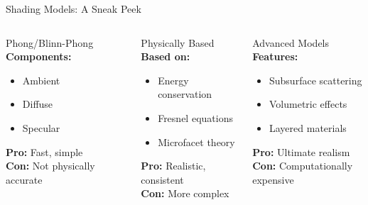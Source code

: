 \begin{frame}{Shading Models: A Sneak Peek}
    \begin{columns}
        \begin{column}{0.33\textwidth}
            \begin{conceptbox}{Phong/Blinn-Phong}
                \textbf{Components:}
                \begin{itemize}
                    \item Ambient
                    \item Diffuse
                    \item Specular
                \end{itemize}
                \textbf{Pro:} Fast, simple\\
                \textbf{Con:} Not physically accurate
            \end{conceptbox}
        \end{column}
        \begin{column}{0.33\textwidth}
            \begin{conceptbox}{Physically Based}
                \textbf{Based on:}
                \begin{itemize}
                    \item Energy conservation
                    \item Fresnel equations
                    \item Microfacet theory
                \end{itemize}
                \textbf{Pro:} Realistic, consistent\\
                \textbf{Con:} More complex
            \end{conceptbox}
        \end{column}
        \begin{column}{0.33\textwidth}
            \begin{conceptbox}{Advanced Models}
                \textbf{Features:}
                \begin{itemize}
                    \item Subsurface scattering
                    \item Volumetric effects
                    \item Layered materials
                \end{itemize}
                \textbf{Pro:} Ultimate realism\\
                \textbf{Con:} Computationally expensive
            \end{conceptbox}
        \end{column}
    \end{columns}
\end{frame}

